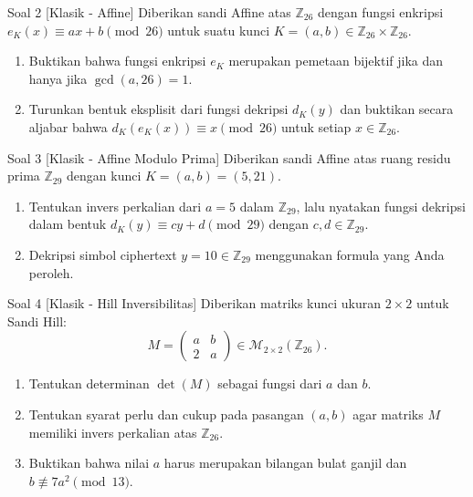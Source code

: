 \documentclass[11pt,a4paper]{article}
\begin{document}
\begin{soalklasik}{Soal 2 [Klasik - Affine]}
Diberikan sandi Affine atas $\mathbb{Z}_{26}$ dengan fungsi enkripsi $e_K(x) \equiv ax + b \pmod{26}$ untuk suatu kunci $K = (a, b) \in \mathbb{Z}_{26} \times \mathbb{Z}_{26}$.
\begin{enumerate}[label=(\alph*)]
    \item Buktikan bahwa fungsi enkripsi $e_K$ merupakan pemetaan bijektif jika dan hanya jika $\gcd(a, 26) = 1$.
    \item Turunkan bentuk eksplisit dari fungsi dekripsi $d_K(y)$ dan buktikan secara aljabar bahwa $d_K(e_K(x)) \equiv x \pmod{26}$ untuk setiap $x \in \mathbb{Z}_{26}$.
\end{enumerate}
\end{soalklasik}

\begin{soalklasik}{Soal 3 [Klasik - Affine Modulo Prima]}
Diberikan sandi Affine atas ruang residu prima $\mathbb{Z}_{29}$ dengan kunci $K = (a, b) = (5, 21)$.
\begin{enumerate}[label=(\alph*)]
    \item Tentukan invers perkalian dari $a = 5$ dalam $\mathbb{Z}_{29}$, lalu nyatakan fungsi dekripsi dalam bentuk $d_K(y) \equiv cy + d \pmod{29}$ dengan $c, d \in \mathbb{Z}_{29}$.
    \item Dekripsi simbol ciphertext $y = 10 \in \mathbb{Z}_{29}$ menggunakan formula yang Anda peroleh.
\end{enumerate}
\end{soalklasik}

\begin{soalklasik}{Soal 4 [Klasik - Hill Inversibilitas]}
Diberikan matriks kunci ukuran $2 \times 2$ untuk Sandi Hill:
\[
M = \begin{pmatrix} a & b \\ 2 & a \end{pmatrix} \in \mathcal{M}_{2 \times 2}(\mathbb{Z}_{26}).
\]
\begin{enumerate}[label=(\alph*)]
    \item Tentukan determinan $\det(M)$ sebagai fungsi dari $a$ dan $b$.
    \item Tentukan syarat perlu dan cukup pada pasangan $(a, b)$ agar matriks $M$ memiliki invers perkalian atas $\mathbb{Z}_{26}$.
    \item Buktikan bahwa nilai $a$ harus merupakan bilangan bulat ganjil dan $b \not\equiv 7a^2 \pmod{13}$.
\end{enumerate}
\end{soalklasik}
\end{document}
